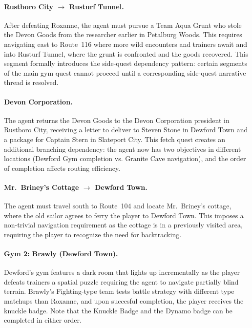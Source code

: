 \paragraph{Rustboro City $\to$ Rusturf Tunnel.} After defeating Roxanne, the agent must pursue a Team Aqua Grunt who stole the Devon Goods from the researcher earlier in Petalburg Woods. This requires navigating east to Route~116 where more wild encounters and trainers await and into Rusturf Tunnel, where the grunt is confronted and the goods recovered. This segment formally introduces the side-quest dependency pattern: certain segments of the main gym quest cannot proceed until a corresponding side-quest narrative thread is resolved.

\paragraph{Devon Corporation.} The agent returns the Devon Goods to the Devon Corporation president in Rustboro City, receiving a letter to deliver to Steven Stone in Dewford Town and a package for Captain Stern in Slateport City. This fetch quest creates an additional branching dependency: the agent now has two objectives in different locations (Dewford Gym completion vs. Granite Cave navigation), and the order of completion affects routing efficiency.

\paragraph{Mr.\ Briney's Cottage $\to$ Dewford Town.} The agent must travel south to Route~104 and locate Mr.\ Briney's cottage, where the old sailor agrees to ferry the player to Dewford Town. This imposes a non-trivial navigation requirement as the cottage is in a previously visited area, requiring the player to recognize the need for backtracking.

\paragraph{Gym 2: Brawly (Dewford Town).} Dewford's gym features a dark room that lights up incrementally as the player defeats trainers a spatial puzzle requiring the agent to navigate partially blind terrain. Brawly's Fighting-type team tests battle strategy with different type matchups than Roxanne, and upon succesful completion, the player receives the knuckle badge. Note that the Knuckle Badge and the Dynamo badge can be completed in either order.

